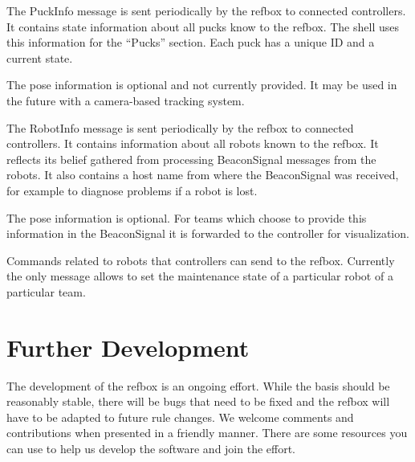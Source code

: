 \documentclass[a4paper]{article}
\begin{document}
%
{%
  The PuckInfo message is sent periodically by the refbox to connected
  controllers. It contains state information about all pucks know to
  the refbox. The shell uses this information for the ``Pucks''
  section. Each puck has a unique ID and a current state.

  \medskip

  The pose information is optional and not currently provided. It may
  be used in the future with a camera-based tracking system.
}

%
{%
  The RobotInfo message is sent periodically by the refbox to
  connected controllers. It contains information about all robots
  known to the refbox. It reflects its belief gathered from processing
  BeaconSignal messages from the robots. It also contains a host name
  from where the BeaconSignal was received, for example to diagnose
  problems if a robot is lost.

  \medskip

  The pose information is optional. For teams which choose to provide
  this information in the BeaconSignal it is forwarded to the
  controller for visualization.
}

%
{%
  Commands related to robots that controllers can send to the
  refbox. Currently the only message allows to set the maintenance
  state of a particular robot of a particular team.
}

\section{Further Development}
\label{sec:dev}
The development of the refbox is an ongoing effort. While the basis
should be reasonably stable, there will be bugs that need to be fixed
and the refbox will have to be adapted to future rule changes. We
welcome comments and contributions when presented in a friendly
manner. There are some resources you can use to help us develop the
software and join the effort.
\end{document}
